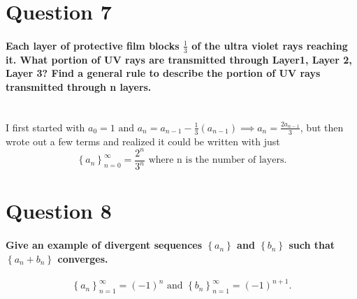 \section*{Question 7}%
\paragraph{Each layer of protective film blocks $ \frac{ 1 }{ 3 }  $ of the ultra violet rays reaching it. What portion of UV rays are transmitted through Layer1, Layer 2, Layer 3? Find a general rule to describe the portion of UV rays transmitted through n layers. \\ \\}
I first started with $ a_0 =1 \text{ and }a_n=a_{ n-1 }-\frac{ 1 }{ 3 } \left( a_{ n-1 } \right) \implies a_n= \frac{ 2a_{ n-1 } }{ 3 } $, but then wrote out a few terms and realized it could be written with just \[
\left\{ a_n \right\} _{ n=0 }^{ \infty }= \frac{ 2^{ n } }{ 3^{ n } }\text{ where n is the number of layers}
.\] 
\section*{Question 8}%
\paragraph{Give an example of divergent sequences $ \left\{ a_n \right\}  $ and $ \left\{ b_n \right\}  $ such that $ \left\{ a_n + b_n \right\}  $ converges. }
\[
\left\{ a_n \right\} _{ n=1 }^{ \infty }=\left( -1 \right) ^{ n }\text{ and }\left\{ b_n \right\} _{ n=1 }^{ \infty }=\left( -1 \right) ^{ n+1 }
.\] 


